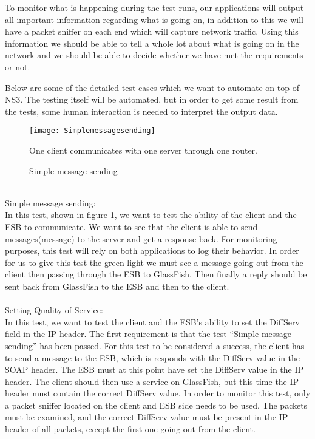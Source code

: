     To monitor what is happening during the test-runs, our applications will output all important information regarding what is going on, in addition to this we will have a \gls{packet sniffer} on each end which will capture network traffic. Using this information we should be able to tell a whole lot about what is going on in the network and we should be able to decide whether we have met the requirements or not.

    Below are some of the detailed test cases which we want to automate on top of NS3. The testing itself will be automated, but in order to get some result from the tests, some human interaction is needed to interpret the output data.
\\
    \begin{figure}[h]
        \centering
        \texttt{[image: Simplemessagesending]}
        \caption{Simple message sending}
        One client communicates with one server through one router.
        \label{fig:Simple message sending}
    \end{figure}
\\
Simple message sending:\\
    In this test, shown in figure \ref{fig:Simple message sending}, we want to test the ability of the client and the ESB to communicate. We want to see that the client is able to send messages(\gls{message}) to the server and get a response back. For monitoring purposes, this test will rely on both applications to log their behavior. In order for us to give this test the green light we must see a message going out from the client then passing through the ESB to GlassFish. Then finally a reply should be sent back from GlassFish to the ESB and then to the client.
\\\\
Setting Quality of Service:\\
    In this test, we want to test the client and the ESB’s ability to set the DiffServ field in the IP header. The first requirement is that the test “Simple message sending” has been passed. For this test to be considered a success, the client has to send a message to the ESB, which is responds with the DiffServ value in the SOAP header. The ESB must at this point have set the DiffServ value in the IP header. The client should then use a service on GlassFish, but this time the IP header must contain the correct DiffServ value. In order to monitor this test, only a packet sniffer located on the client and ESB side needs to be used. The packets must be examined, and the correct DiffServ value must be present in the IP header of all packets, except the first one going out from the client.
